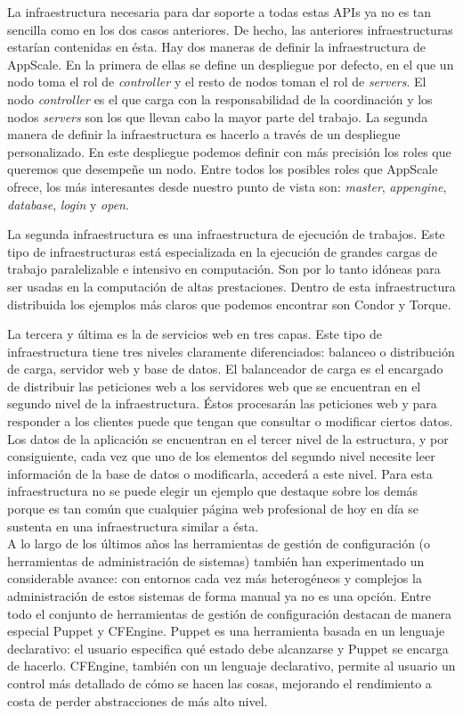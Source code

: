 La infraestructura necesaria para dar soporte a todas estas APIs ya no es tan sencilla como en los dos casos anteriores. De hecho, las anteriores infraestructuras estarían contenidas en ésta. Hay dos maneras de definir la infraestructura de AppScale. En la primera de ellas se define un despliegue por defecto, en el que un nodo toma el rol de \emph{controller} y el resto de nodos toman el rol de \emph{servers}. El nodo \emph{controller} es el que carga con la responsabilidad de la coordinación y los nodos \emph{servers} son los que llevan cabo la mayor parte del trabajo. La segunda manera de definir la infraestructura es hacerlo a través de un despliegue personalizado. En este despliegue podemos definir con más precisión los roles que queremos que desempeñe un nodo. Entre todos los posibles roles que AppScale ofrece, los más interesantes desde nuestro punto de vista son: \emph{master}, \emph{appengine}, \emph{database}, \emph{login} y \emph{open}.

La segunda infraestructura es una infraestructura de ejecución de trabajos. Este tipo de infraestructuras está especializada en la ejecución de grandes cargas de trabajo paralelizable e intensivo en computación. Son por lo tanto idóneas para ser usadas en la computación de altas prestaciones. Dentro de esta infraestructura distribuida los ejemplos más claros que podemos encontrar son Condor y Torque.

La tercera y última es la de servicios web en tres capas. Este tipo de infraestructura tiene tres niveles claramente diferenciados: balanceo o distribución de carga, servidor web y base de datos. El balanceador de carga es el encargado de distribuir las peticiones web a los servidores web que se encuentran en el segundo nivel de la infraestructura. Éstos procesarán las peticiones web y para responder a los clientes puede que tengan que consultar o modificar ciertos datos. Los datos de la aplicación se encuentran en el tercer nivel de la estructura, y por consiguiente, cada vez que uno de los elementos del segundo nivel necesite leer información de la base de datos o modificarla, accederá a este nivel. Para esta infraestructura no se puede elegir un ejemplo que destaque sobre los demás porque es tan común que cualquier página web profesional de hoy en día se sustenta en una infraestructura similar a ésta.\\

A lo largo de los últimos años las herramientas de gestión de configuración (o herramientas de administración de sistemas) también han experimentado un considerable avance: con entornos cada vez más heterogéneos y complejos la administración de estos sistemas de forma manual ya no es una opción. Entre todo el conjunto de herramientas de gestión de configuración destacan de manera especial Puppet y CFEngine. Puppet es una herramienta basada en un lenguaje declarativo: el usuario especifica qué estado debe alcanzarse y Puppet se encarga de hacerlo. CFEngine, también con un lenguaje declarativo, permite al usuario un control más detallado de cómo se hacen las cosas, mejorando el rendimiento a costa de perder abstracciones de más alto nivel.

